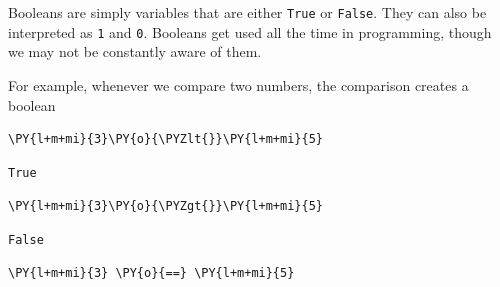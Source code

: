 Booleans are simply variables that are either \texttt{True} or
\texttt{False}. They can also be interpreted as \texttt{1} and
\texttt{0}. Booleans get used all the time in programming, though we may
not be constantly aware of them.

For example, whenever we compare two numbers, the comparison creates a
boolean

    \begin{tcolorbox}[breakable, size=fbox, boxrule=1pt, pad at break*=1mm,colback=cellbackground, colframe=cellborder]
\begin{Verbatim}[commandchars=\\\{\}]
\PY{l+m+mi}{3}\PY{o}{\PYZlt{}}\PY{l+m+mi}{5}
\end{Verbatim}
\end{tcolorbox}

            \begin{tcolorbox}[breakable, size=fbox, boxrule=.5pt, pad at break*=1mm, opacityfill=0]
\begin{Verbatim}[commandchars=\\\{\}]
True
\end{Verbatim}
\end{tcolorbox}
        
    \begin{tcolorbox}[breakable, size=fbox, boxrule=1pt, pad at break*=1mm,colback=cellbackground, colframe=cellborder]
\begin{Verbatim}[commandchars=\\\{\}]
\PY{l+m+mi}{3}\PY{o}{\PYZgt{}}\PY{l+m+mi}{5}
\end{Verbatim}
\end{tcolorbox}

            \begin{tcolorbox}[breakable, size=fbox, boxrule=.5pt, pad at break*=1mm, opacityfill=0]
\begin{Verbatim}[commandchars=\\\{\}]
False
\end{Verbatim}
\end{tcolorbox}
        
    \begin{tcolorbox}[breakable, size=fbox, boxrule=1pt, pad at break*=1mm,colback=cellbackground, colframe=cellborder]
\begin{Verbatim}[commandchars=\\\{\}]
\PY{l+m+mi}{3} \PY{o}{==} \PY{l+m+mi}{5}
\end{Verbatim}
\end{tcolorbox}

